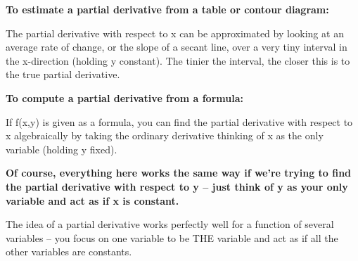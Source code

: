 \textbf{To estimate a partial derivative from a table or contour
diagram:}

The partial derivative with respect to x can be approximated by looking
at an average rate of change, or the slope of a secant line, over a very
tiny interval in the x-direction (holding y constant). The tinier the
interval, the closer this is to the true partial derivative.

\textbf{To compute a partial derivative from a formula:}

If f(x,y) is given as a formula, you can find the partial derivative
with respect to x algebraically by taking the ordinary derivative
thinking of x as the only variable (holding y fixed).

\textbf{Of course, everything here works the same way if we're trying to
find the partial derivative with respect to y -- just think of y as your
only variable and act as if x is constant.}

The idea of a partial derivative works perfectly well for a function of
several variables -- you focus on one variable to be THE variable and
act as if all the other variables are constants.

\textbf{\\
}

